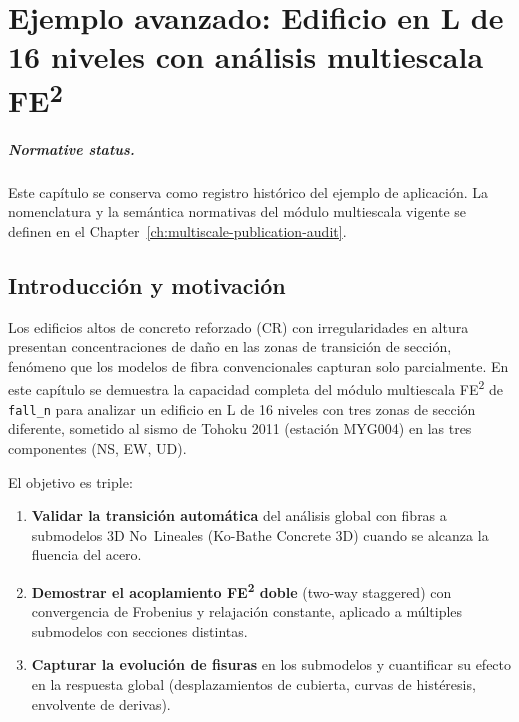 
\chapter{Ejemplo avanzado: Edificio en L de 16 niveles con análisis
         multiescala FE\textsuperscript{2}}
\label{ch:multiscale-16storey}

\paragraph{Normative status.}
Este capítulo se conserva como registro histórico del ejemplo de aplicación.
La nomenclatura y la semántica normativas del módulo multiescala vigente se
definen en el Chapter~\ref{ch:multiscale-publication-audit}.

\section{Introducción y motivación}
\label{sec:ms16-intro}

Los edificios altos de concreto reforzado (CR) con irregularidades en
altura presentan concentraciones de daño en las zonas de transición de
sección, fenómeno que los modelos de fibra convencionales capturan solo
parcialmente.  En este capítulo se demuestra la capacidad completa del
módulo multiescala FE\textsuperscript{2} de \texttt{fall\_n} para analizar
un edificio en L de 16 niveles con tres zonas de sección diferente,
sometido al sismo de Tohoku 2011 (estación MYG004) en las tres
componentes (NS, EW, UD).

El objetivo es triple:
\begin{enumerate}
  \item \textbf{Validar la transición automática} del análisis global
        con fibras a submodelos 3D No~Lineales (Ko-Bathe Concrete 3D)
        cuando se alcanza la fluencia del acero.
  \item \textbf{Demostrar el acoplamiento FE\textsuperscript{2} doble}
        (two-way staggered) con convergencia de Frobenius y relajación
        constante, aplicado a múltiples submodelos con secciones
        distintas.
  \item \textbf{Capturar la evolución de fisuras} en los submodelos y
        cuantificar su efecto en la respuesta global (desplazamientos
        de cubierta, curvas de histéresis, envolvente de derivas).
\end{enumerate}

